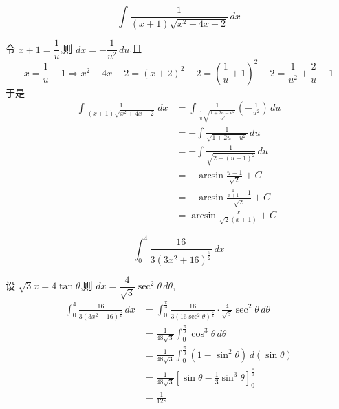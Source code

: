 \begin{questions}
    \question
    \[
    \int \frac{1}{(x+1)\sqrt{x^2+4x+2}} \, dx
    \]
    \begin{solution}
        令 $x+1 = \dfrac{1}{u}$,则 $dx = -\dfrac{1}{u^2} \, du$,且 
        \[
        x = \dfrac{1}{u}-1 \Rightarrow x^2+4x+2 = (x+2)^2-2 = \left(\frac{1}{u}+1\right)^2-2 = \frac{1}{u^2}+\frac{2}{u}-1
        \]
        于是
        \begin{align*}
        \int \frac{1}{(x+1)\sqrt{x^2+4x+2}} \, dx 
        &= \int \frac{1}{\frac{1}{u}\sqrt{\frac{1+2u-u^2}{u^2}}} \left(-\frac{1}{u^2}\right) \, du \\
        &= -\int \frac{1}{\sqrt{1+2u-u^2}} \, du \\
        &= -\int \frac{1}{\sqrt{2-(u-1)^2}} \, du \\
        &= -\arcsin \frac{u-1}{\sqrt{2}} + C \\
        &= -\arcsin \frac{\frac{1}{x+1}-1}{\sqrt{2}} + C \\
        &= \arcsin \frac{x}{\sqrt{2}(x+1)} + C
        \end{align*}
    \end{solution}

    \question
    \[
    \int_{0}^{4} \frac{16}{3(3x^2+16)^{\frac{5}{2}}} \, dx
    \]
    \begin{solution}
        设 $\sqrt{3}x = 4 \tan \theta$,则 $dx = \dfrac{4}{\sqrt{3}}\sec^2 \theta \, d\theta$,
        \begin{align*}
        \int_{0}^{4} \frac{16}{3(3x^2+16)^{\frac{5}{2}}} \, dx
        &= \int_{0}^{\frac{\pi}{3}} \frac{16}{3(16\sec^2 \theta)^{\frac{5}{2}}} \cdot \frac{4}{\sqrt{3}}\sec^2 \theta \, d\theta \\
        &= \frac{1}{48\sqrt{3}} \int_{0}^{\frac{\pi}{3}} \cos^3 \theta \, d\theta \\
        &= \frac{1}{48\sqrt{3}} \int_{0}^{\frac{\pi}{3}} (1-\sin^2 \theta) \, d(\sin \theta) \\
        &= \frac{1}{48\sqrt{3}} \left[ \sin \theta - \frac{1}{3}\sin^3 \theta \right]_{0}^{\frac{\pi}{3}} \\
        &= \frac{1}{128}
        \end{align*}
    \end{solution}


\end{questions}
